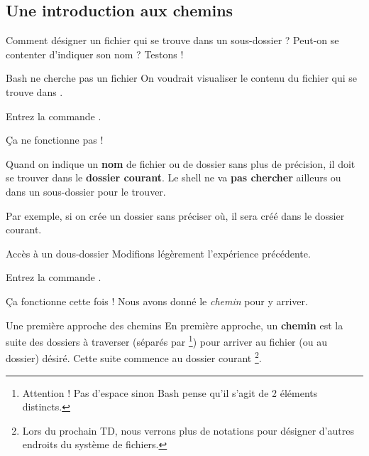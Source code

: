 \documentclass[a4paper,11pt]{style-esi/td}
\begin{document}
	\subsection{Une introduction aux chemins}

		Comment désigner un fichier qui se trouve dans un sous-dossier ?
		Peut-on se contenter d'indiquer son nom ? Testons !

		\begin{Experience}{Bash ne cherche pas un fichier}
			On voudrait visualiser le contenu du fichier 
			qui se trouve dans .
			\begin{steps}
			\item 
				Entrez la commande .
			\end{steps}
			\c Ca ne fonctionne pas !
		\end{Experience}

		\begin{alertbox}
			Quand on indique un \textbf{nom} de fichier ou de dossier sans plus de précision,
			il doit se trouver dans le \textbf{dossier courant}.
			Le shell ne va \textbf{pas chercher} ailleurs ou dans un sous-dossier 
			pour le trouver. 
		\end{alertbox}

		Par exemple, si on crée un dossier sans préciser où,
		il sera créé dans le dossier courant.

\newpage

		\begin{Experience}{Accès à un dous-dossier}
			Modifions légèrement l'expérience précédente.
			\begin{steps}
			\item 
				Entrez la commande \kbd{cat dev1/readme}.
			\end{steps}
			\c Ca fonctionne cette fois !
			Nous avons donné le \emph{chemin} pour y arriver.
		\end{Experience}

		\begin{theorie}{Une première approche des chemins}
			En première approche, un \textbf{chemin}
			est la suite des dossiers à traverser 
			(séparés par \samp{/}%
			\footnote{%
				Attention ! Pas d'espace sinon Bash pense 
				qu'il s'agit de 2 éléments distincts.
			})
			pour arriver au fichier
			(ou au dossier) désiré.
			Cette suite commence au dossier courant%
			\footnote{%
				Lors du prochain TD, 
				nous verrons plus de notations pour désigner 
				d'autres endroits du système de fichiers.
			}.
		\end{theorie}
\end{document}
